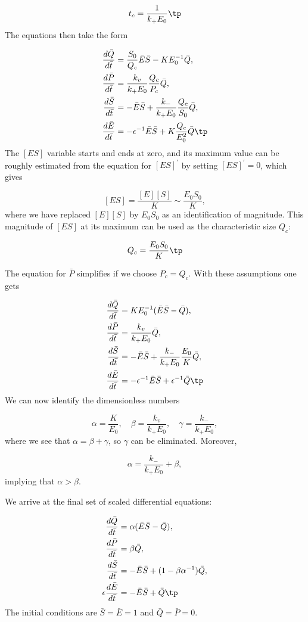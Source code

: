 \documentclass[graybox,envcountchap,sectrefs,final]{svmonodo}
\begin{document}
\[ t_c = \frac{1}{k_+E_0}\tp\]
The equations then take the form

\begin{align*}
\frac{d\bar Q}{d\bar t} &= \frac{S_0}{Q_c}\bar E\bar S
- KE_0^{-1}\bar Q,\\ 
\frac{d\bar P}{d\bar t} &= \frac{k_v}{k_+ E_0}\frac{Q_c}{P_c}\bar Q,\\ 
\frac{d\bar S}{d\bar t} &= -\bar E\bar S
+ \frac{k_-}{k_+E_0}\frac{Q_c}{S_0}\bar Q,\\ 
\frac{d\bar E}{d\bar t} &= -\epsilon^{-1}\bar E\bar S
+ K\frac{Q_c}{E_0^2}\bar Q\tp
\end{align*}
The $[ES]$ variable starts and ends at zero, and its maximum value
can be roughly estimated from the equation for $[ES]^\prime$
by setting $[ES]^\prime = 0$, which gives

\[ [ES] = \frac{[E][S]}{K}\sim \frac{E_0S_0}{K},\]
where we have replaced $[E][S]$ by $E_0S_0$ as an identification
of magnitude. This magnitude of $[ES]$
at its maximum can be used as the characteristic size $Q_c$:

\[ Q_c = \frac{E_0S_0}{K}\tp\]

The equation for $\bar P$ simplifies if we choose $P_c=Q_c$.
With these assumptions one gets

\begin{align*}
\frac{d\bar Q}{d\bar t} &= KE_0^{-1} (\bar E\bar S
- \bar Q),\\ 
\frac{d\bar P}{d\bar t} &= \frac{k_v}{k_+ E_0}\bar Q,\\ 
\frac{d\bar S}{d\bar t} &= -\bar E\bar S
+ \frac{k_-}{k_+E_0}\frac{E_0}{K}\bar Q,\\ 
\frac{d\bar E}{d\bar t} &= -\epsilon^{-1}\bar E\bar S
+ \epsilon^{-1}\bar Q\tp
\end{align*}
We can now identify the dimensionless numbers

\[ \alpha = \frac{K}{E_0},\quad \beta = \frac{k_v}{k_+ E_0},
\quad \gamma = \frac{k_-}{k_+E_0},
\]
where we see that $\alpha = \beta + \gamma$, so $\gamma$ can be eliminated.
Moreover,

\[ \alpha = \frac{k_-}{k_+E_0} + \beta,\]
implying that $\alpha > \beta$.

We arrive at the final set of scaled differential equations:

\begin{align}
\frac{d\bar Q}{d\bar t} &= \alpha (\bar E\bar S
- \bar Q),
\label{scale:MMK:Q2}\\ 
\frac{d\bar P}{d\bar t} &= \beta\bar Q,
\label{scale:MMK:P2}\\ 
\frac{d\bar S}{d\bar t} &= -\bar E\bar S
+ (1 - \beta\alpha^{-1})\bar Q,
\label{scale:MMK:S2}\\ 
\epsilon\frac{d\bar E}{d\bar t} &= -\bar E\bar S + \bar Q\tp
\label{scale:MMK:E2}
\end{align}
The initial conditions are $\bar S=\bar E =1$ and $\bar Q=\bar P=0$.
\end{document}
